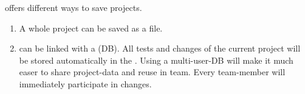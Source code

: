 \GD offers different ways to save projects. 
\begin{enumerate}
\item A whole project can be saved as a file. 
\item \GD can be  linked with a \bxdb (DB). All tests
 and changes  of the current project will be stored automatically in the \bxdb. Using a
 multi-user-DB will
 make it much easer to share project-data and reuse \gdcases in
 team.   Every team-member will  immediately  participate in changes. 
\end{enumerate}

